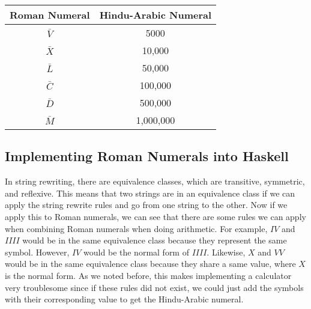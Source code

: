 \documentclass{article}
\begin{document}
\begin{center}
\begin{tabular}{||c c||} 
 \hline
 Roman Numeral & Hindu-Arabic Numeral \\ [0.5ex] 
 \hline
 $\bar{V}$ & 5000 \\
 \hline
 $\bar{X}$ & 10,000 \\
 \hline
 $\bar{L}$ & 50,000 \\
 \hline
 $\bar{C}$ & 100,000 \\
 \hline
 $\bar{D}$ & 500,000 \\
 \hline
 $\bar{M}$ & 1,000,000 \\
 \hline
\end{tabular}
\end{center}

\subsection{Implementing Roman Numerals into Haskell}
In string rewriting, there are equivalence classes, which are transitive, symmetric, and reflexive. This means that two strings are in an equivalence class if we can apply the string rewrite rules and go from one string to the other. Now if we apply this to Roman numerals, we can see that there are some rules we can apply when combining Roman numerals when doing arithmetic. For example, $IV$ and $IIII$ would be in the same equivalence class because they represent the same symbol. However, $IV$ would be the normal form of $IIII$. Likewise, $X$ and $VV$ would be in the same equivalence class because they share a same value, where $X$ is the normal form. As we noted before, this makes implementing a calculator very troublesome since if these rules did not exist, we could just add the symbols with their corresponding value to get the Hindu-Arabic numeral.
\end{document}

